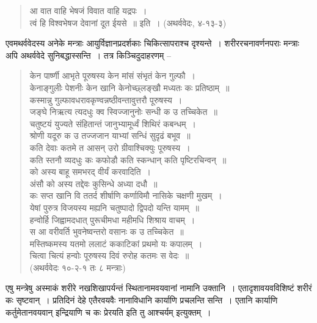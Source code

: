 {\begin{verse}
{आ वात वाहि भेषजं विवात वाहि यद्रपः~। }\\
{त्वं हि विश्वभेषज देवानां दूत ईयसे~॥ इति~। } (अथर्ववेदः, ४-१३-३)
\end{verse}

एवमथर्ववेदस्य अनेके मन्त्राः आयुर्विज्ञानप्रदर्शकाः चिकित्सापराश्च दृश्यन्ते~। शरीररचनावर्णनपराः मन्त्राः अपि अथर्ववेदे सुनिबद्धास्सन्ति~। तत्र किञ्चिदुदाहरणम् –

\begin{verse}
{केन पार्ष्णी आभृते पूरुषस्य केन मांसं संभृतं केन गुल्फौ~। }\\
{केनाङ्गुलीः पेशनीः केन खानि केनोच्छ्लङ्खौ मध्यतः कः प्रतिष्ठाम्~॥}\\
{कस्मान्नु गुल्फावधरावकृण्वन्नष्ठीवन्तावुत्तरौ पूरुषस्य~। }\\
{जङ्घे निऋत्य त्यदधुः क्व स्विज्जानुनोः सन्धी क उ तच्चिकेत~॥}\\
{चतुष्टयं युज्यते संहितान्तं जानुभ्यामूर्ध्वं शिथिरं कबन्धम्~। }\\
{श्रोणी यदूरु क उ तज्जजान याभ्यां सन्धिं सुदृढं बभूव~॥}\\
{कति देवाः कतमे त आसन् उरो ग्रीवाश्चिक्युः पूरुषस्य~। }\\
{कति स्तनौ व्यदधुः कः कफोडौ कति स्कन्धान् कति पृष्टिरचिन्वन्~॥}\\
{को अस्य बाहू समभरद् वीर्यं करवादिति~। }\\
{अंसौ को अस्य तद्देवः कुसिन्धे अध्या दधौ~॥}\\
{कः सप्त खानि वि ततर्द शीर्षाणि कर्णाविमौ नासिके चक्षणी मुखम्~। }\\
{येषां पुरुत्र विजयस्य मह्यनि चतुष्पादो द्विपदो यन्ति यामम्~॥}\\
{हन्वोर्हि जिह्वामदधात् पुरूचीमधा महीमधि शिश्राय वाचम्~। }\\
{स आ वरीवर्ति भुवनेष्वन्तरो वसानः क उ तच्चिकेत~॥}\\
{मस्तिष्कमस्य यतमो ललाटं ककाटिकां प्रथमो यः कपालम्~। }\\
{चित्वा चित्यं हन्वोः पूरुषस्य दिवं रुरोह कतमः स वेदः~॥}\\
\hspace{4cm}(अथर्ववेदः १०-२-१ तः ८ मन्त्राः)
\end{verse}

एषु मन्त्रेषु अस्माकं शरीरे नखशिखापर्यन्तं स्थितानामवयवानां नामानि उक्तानि~। एतादृशावयवविशिष्टं शरीरं कः सृष्टवान्~। प्रतिदिनं देहे एतैरवयवैः नानाविधानि कार्याणि प्रचलन्ति सन्ति~। एतानि कार्याणि कर्तुमेतानवयवान् इन्द्रियाणि च कः प्रेरयति इति तु आश्चर्यम् इत्युक्तम्~। 


}
